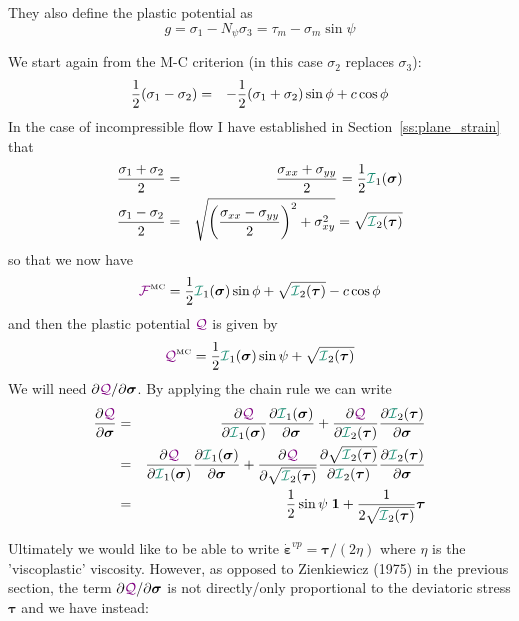 They also define the plastic potential as 
\[
g=\sigma_1 -N_\psi \sigma_3  =\tau_m - \sigma_m \sin\psi
\]

We start again from the M-C criterion (in this case $\sigma_2$ replaces $\sigma_3$):
\begin{eqnarray}
\frac{1}{2}(\sigma_1-\sigma_2) &=& - \frac{1}{2}(\sigma_1+\sigma_2)  \sin \phi + c \cos \phi  \nonumber\\
\end{eqnarray}
In the case of incompressible flow I have established in Section~\ref{ss:plane_strain} that 
\begin{eqnarray}
\frac{\sigma_1+\sigma_2}{2} &=& \frac{\sigma_{xx}+\sigma_{yy}}{2} = \frac12 {\III}_1(\bm\sigma)\\
\frac{\sigma_1-\sigma_2}{2} &=& \sqrt{ \left(\frac{\sigma_{xx}-\sigma_{yy}}{2}\right)^2 + \sigma_{xy}^2  }
=\sqrt{ {\III}_2(\bm\tau)  }
\end{eqnarray}
so that we now have
\[
{\cal \FFF}^{\text{\tiny MC}} 
= \frac{1}{2}{\III}_1(\bm\sigma) \sin\phi  + 
\sqrt{ {\III}_2(\bm\tau)  }
-c \cos \phi 
\]
and then the plastic potential ${\color{violet}\cal Q}$ is given by
\[
{\QQQ}^{\text{\tiny MC}}=\frac{1}{2}{\III}_1(\bm\sigma) \sin\psi  + \sqrt{ {\III}_2(\bm\tau)  }
\]
We will need $\partial {{\color{violet}\cal Q}}/\partial \bm\sigma$.
By applying the chain rule we can write
\begin{eqnarray}
\frac{\partial {\QQQ}}{\partial \bm\sigma} 
&=&
\frac{\partial {\QQQ}}{\partial {\III}_1(\bm\sigma)} 
\frac{\partial {\III}_1(\bm\sigma)}{\partial \bm\sigma} 
+
\frac{\partial {\QQQ}}{\partial {\III}_2(\bm\tau)} 
\frac{\partial {\III}_2(\bm\tau)}{\partial \bm\sigma} \nn\\
&=&
\frac{\partial {\QQQ}}{\partial {\III}_1(\bm\sigma)} 
\frac{\partial {\III}_1(\bm\sigma)}{\partial \bm\sigma} 
+
\frac{\partial {\QQQ}}{\partial \sqrt{{\III}_2(\bm\tau)}} 
\frac{\partial \sqrt{ {\III}_2(\bm\tau)}   }{\partial {\III}_2(\bm\tau)} 
\frac{\partial {\III}_2(\bm\tau)}{\partial \bm\sigma} \nn\\
&=&
\frac12 \sin\psi \; {\bm 1} + \frac{1}{2 \sqrt{ {\III}_2(\bm\tau)}} 
\bm\tau
\end{eqnarray}

Ultimately we would like to be able to write $\dot{\bm \varepsilon}^{vp} = \bm\tau /(2\eta)$
where $\eta$ is the 'viscoplastic' viscosity. However, as opposed to Zienkiewicz (1975) in the 
previous section, the term $\partial {{\color{violet}\cal Q}}/\partial \bm\sigma$
is not directly/only proportional to the deviatoric stress $\bm\tau$ and we have instead:

